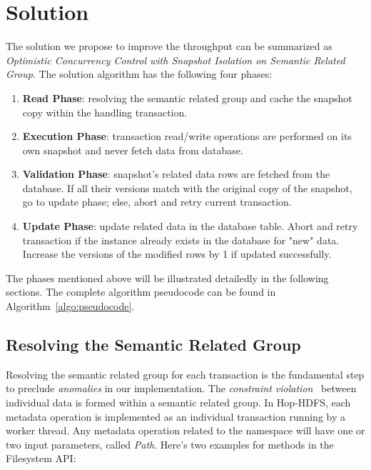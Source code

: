 
%
%


\chapter{Solution}
The solution we propose to improve the throughput can be summarized as \textit{Optimistic Concurrency Control with Snapshot Isolation on Semantic Related Group}. The solution algorithm has the following four phases:
\begin{enumerate}[noitemsep]
	\item \textbf{Read Phase}: resolving the semantic related group and cache the snapshot copy within the handling transaction.
	\item \textbf{Execution Phase}: transaction read/write operations are performed on its own snapshot and never fetch data from database.
	\item \textbf{Validation Phase}: snapshot's related data rows are fetched from the database. If all their versions match with the original copy of the snapshot, go to update phase; else, abort and retry current transaction.
	\item \textbf{Update Phase}: update related data in the database table. Abort and retry transaction if the instance already exists in the database for "new" data. Increase the versions of the modified rows by 1 if updated successfully.
\end{enumerate}
\label{ch:Design}

\noindent The phases mentioned above will be illustrated detailedly in the following sections. The complete algorithm pseudocode can be found in Algorithm~\ref{algo:pseudocode}.
\section{Resolving the Semantic Related Group}

Resolving the semantic related group for each transaction is the fundamental step to preclude \textit{anomalies} in our implementation. The \textit{constraint violation}~\cite{berenson1995critique} between individual data is formed within a semantic related group. In Hop-HDFS, each metadata operation is implemented as an individual transaction running by a worker thread. Any metadata operation related to the namespace will have one or two input parameters, called \textit{Path}. Here's two examples for methods in the Filesystem API:

